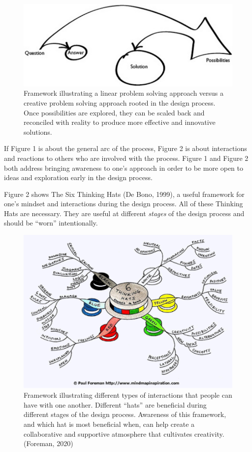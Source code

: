 \documentclass[11.5pt]{sig-alternate} %
\begin{document}
\begin{large}
\begin{figure}[h!]
    \centering
    \includegraphics[width=\columnwidth]{figure1.png}
    \caption{Framework illustrating a linear problem solving approach versus a creative problem solving approach rooted in the design process. Once possibilities are explored, they can be scaled back and reconciled with reality to produce more effective and innovative solutions. }
\end{figure}

If Figure 1 is about the general arc of the process, Figure 2 is about interactions and reactions to others who are involved with the process. Figure 1 and Figure 2 both address bringing awareness to one’s approach in order to be more open to ideas and exploration early in the design process.

Figure 2 shows The Six Thinking Hats (De Bono, 1999), a useful framework for one’s mindset and interactions during the design process. All of these Thinking Hats are necessary. They are useful at different \textit{stages} of the design process and should be “worn” intentionally.

\begin{figure}[h!]
    \centering
    \includegraphics[width=\columnwidth]{figure2.png}
    \caption{Framework illustrating different types of interactions that people can have with one another. Different “hats” are beneficial during different stages of the design process. Awareness of this framework, and which hat is most beneficial when, can help create a collaborative and supportive atmosphere that cultivates creativity. (Foreman, 2020)}
\end{figure}


\end{large}
\end{document}
